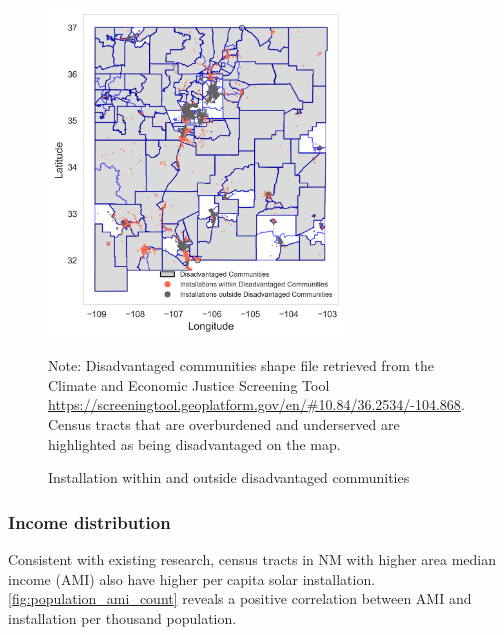 \documentclass[11pt,twoside,letterpaper]{article}
\begin{document}
\begin{figure}[H]
    \centering
\includegraphics[width=0.7\textwidth]{figures/disadvantage_installation.png}
    \caption{Installation within and outside disadvantaged communities}
    \label{fig:disadvantage_installation}
        \begin{flushleft}
        \footnotesize Note: Disadvantaged communities shape file retrieved from the Climate and Economic Justice Screening Tool \url{https://screeningtool.geoplatform.gov/en/#10.84/36.2534/-104.868}. Census tracts that are overburdened and underserved are highlighted as being disadvantaged on the map.
    \end{flushleft}
\end{figure}


\subsubsection{Income distribution}

Consistent with existing research, census tracts in NM with higher area median income (AMI) also have higher per capita solar installation. \autoref{fig:population_ami_count} reveals a positive correlation between AMI and installation per thousand population.
\end{document}
